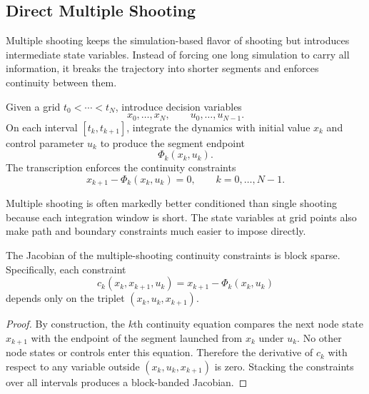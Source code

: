 \subsection{Direct Multiple Shooting}
\label{sec:l5-direct-multiple-shooting}

\begin{intuition}
	Multiple shooting keeps the simulation-based flavor of shooting but introduces intermediate state variables. Instead of forcing one long simulation to carry all information, it breaks the trajectory into shorter segments and enforces continuity between them.
\end{intuition}

\begin{definition}\label{def:l5-multiple-shooting-transcription}
	Given a grid $t_0<\cdots<t_N$, introduce decision variables
	\[
		x_0,\dots,x_N,
		\qquad
		u_0,\dots,u_{N-1}.
	\]
	On each interval $[t_k,t_{k+1}]$, integrate the dynamics with initial value $x_k$ and control parameter $u_k$ to produce the segment endpoint
	\[
		\Phi_k(x_k,u_k).
	\]
	The transcription enforces the continuity constraints
	\[
		x_{k+1}-\Phi_k(x_k,u_k)=0,
		\qquad
		k=0,\dots,N-1.
	\]
\end{definition}

\begin{algorithm}[H]
	\DontPrintSemicolon
	\caption{Direct Multiple Shooting}
\label{alg:l5-direct-multiple-shooting}
\end{algorithm}

\begin{remark}
	Multiple shooting is often markedly better conditioned than single shooting because each integration window is short. The state variables at grid points also make path and boundary constraints much easier to impose directly.
\end{remark}

\begin{proposition}\label{prop:l5-sparsity-structure-of-multiple-shooting}
	The Jacobian of the multiple-shooting continuity constraints is block sparse. Specifically, each constraint
	\[
		c_k(x_k,x_{k+1},u_k)=x_{k+1}-\Phi_k(x_k,u_k)
	\]
	depends only on the triplet $(x_k,u_k,x_{k+1})$.
\end{proposition}
\begin{proof}
	By construction, the $k$th continuity equation compares the next node state $x_{k+1}$ with the endpoint of the segment launched from $x_k$ under $u_k$. No other node states or controls enter this equation. Therefore the derivative of $c_k$ with respect to any variable outside $(x_k,u_k,x_{k+1})$ is zero. Stacking the constraints over all intervals produces a block-banded Jacobian.
\end{proof}

